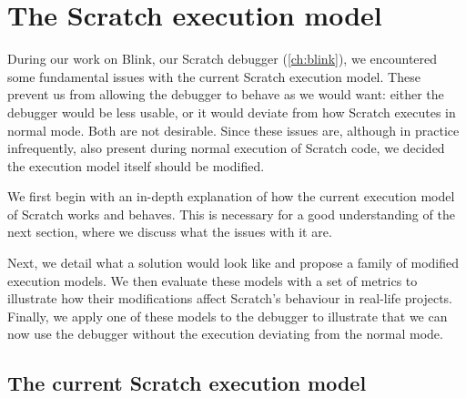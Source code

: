 \documentclass[../main]{subfiles}
\begin{document}
\chapter{The Scratch execution model}\label{ch:scratch-execution-model}


During our work on Blink, our Scratch debugger (\vref{ch:blink}), we encountered some fundamental issues with the current Scratch execution model.
These prevent us from allowing the debugger to behave as we would want: either the debugger would be less usable, or it would deviate from how Scratch executes in normal mode.
Both are not desirable.
Since these issues are, although in practice infrequently, also present during normal execution of Scratch code, we decided the execution model itself should be modified.

We first begin with an in-depth explanation of how the current execution model of Scratch works and behaves.
This is necessary for a good understanding of the next section, where we discuss what the issues with it are.

Next, we detail what a solution would look like and propose a family of modified execution models.
We then evaluate these models with a set of metrics to illustrate how their modifications affect Scratch's behaviour in real-life projects.
Finally, we apply one of these models to the debugger to illustrate that we can now use the debugger without the execution deviating from the normal mode.

\section{The current Scratch execution model}\label{sec:the-current-scratch-execution-model}
\end{document}
